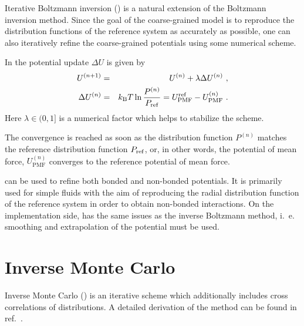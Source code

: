 Iterative Boltzmann inversion (\ibi) is a natural extension of the Boltzmann inversion method. Since the goal of the coarse-grained model is to reproduce the distribution functions of the reference system as accurately as possible, one can also iteratively refine the coarse-grained potentials using some numerical scheme.

In \ibi the potential update $\Delta U$ is given by~\cite{Reith:2003}
\begin{eqnarray}
  \label{eq:iter_boltzmann}
  U^{(n+1)} &=& U^{(n)} + \lambda \Delta U^{(n)}~, \\
  \Delta U^{(n)} &=&  k_\text{B} T \ln  \frac{P^{(n)}}{P_{\rm ref}}
  =  U_\text{PMF}^\text{ref} - U_\text{PMF}^{(n)}~.
\end{eqnarray}
Here $\lambda \in (0,1]$ is a numerical factor which helps to stabilize the scheme.

The convergence is reached as soon as the distribution function $P^{(n)}$ matches the reference distribution function $P_{\rm ref}$, or, in other words, the potential of mean force, $U_\text{PMF}^{(n)}$ converges to the reference potential of mean force.

\ibi can be used to refine both bonded and non-bonded potentials. It is primarily used for simple fluids with the aim of reproducing the radial distribution function of the reference system in order to obtain non-bonded interactions. On the implementation side, \ibi has the same issues as the inverse Boltzmann method, i.~e. smoothing and extrapolation of the potential must be used.


\section{Inverse Monte Carlo}
\label{sec:imc}

Inverse Monte Carlo (\imc) is an iterative scheme which additionally includes cross correlations of distributions. A detailed derivation of the \imc method can be found in ref.~\cite{Lyubartsev:1995}.

